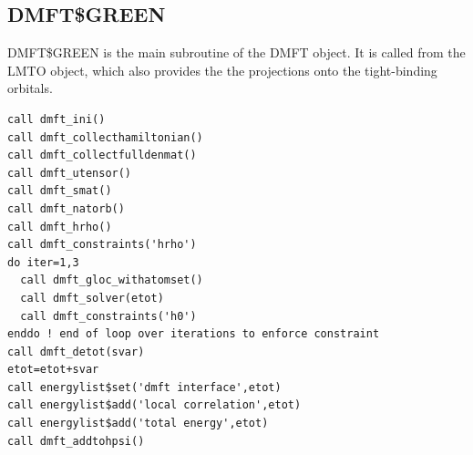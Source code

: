 \documentclass[11pt,a4paper]{report}
\begin{document}
\subsection{DMFT\$GREEN}
DMFT\$GREEN is the main subroutine of the DMFT object. It is called
from the LMTO object, which also provides the the projections onto the
tight-binding orbitals.

\begin{verbatim}
call dmft_ini()
call dmft_collecthamiltonian()  
call dmft_collectfulldenmat()  
call dmft_utensor() 
call dmft_smat()
call dmft_natorb()
call dmft_hrho()
call dmft_constraints('hrho')
do iter=1,3
  call dmft_gloc_withatomset() 
  call dmft_solver(etot) 
  call dmft_constraints('h0')
enddo ! end of loop over iterations to enforce constraint
call dmft_detot(svar)
etot=etot+svar      
call energylist$set('dmft interface',etot)
call energylist$add('local correlation',etot)
call energylist$add('total energy',etot)
call dmft_addtohpsi()
\end{verbatim}
\end{document}
